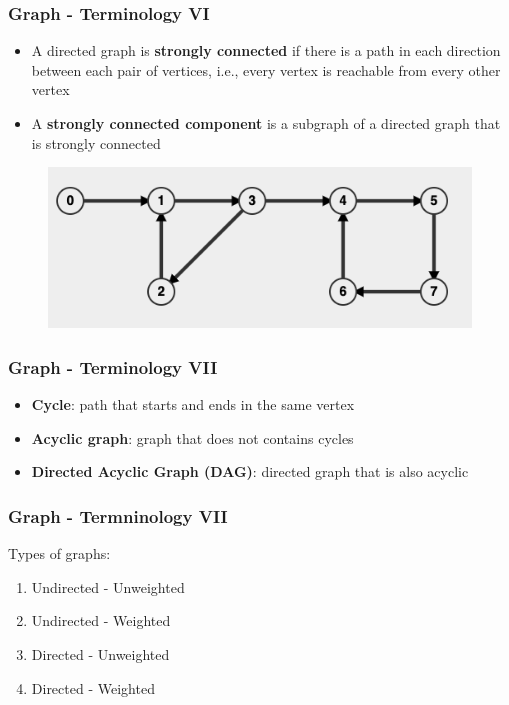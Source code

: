\documentclass{beamer}
\begin{document}
\begin{frame}[fragile]
\frametitle{Graph - Terminology VI}

\begin{itemize}
\item A directed graph is \textbf{strongly connected} if there is a path in each direction between each pair of vertices, i.e., every vertex is reachable from every other vertex
\item A \textbf{strongly connected component} is a subgraph of a directed graph that is strongly connected
\end{itemize}

\begin{figure}
	\centering
	\includegraphics[scale=0.3]{imgs/2.4/graph/directed-graph.png}
\end{figure}
\end{frame}

\begin{frame}
\frametitle{Graph - Terminology VII}
	\begin{itemize}
	    \item \textbf{Cycle}: path that starts and ends in the same vertex
	    \item \textbf{Acyclic graph}: graph that does not contains cycles
	    \item \textbf{Directed Acyclic Graph (DAG)}: directed graph that is also acyclic
	\end{itemize}
\end{frame}

\begin{frame}
\frametitle{Graph - Termninology VII}
	Types of graphs:
	\begin{enumerate}
	    \item Undirected - Unweighted
	    \item Undirected - Weighted
	    \item Directed - Unweighted
	    \item Directed - Weighted
	\end{enumerate}
\end{frame}
\end{document}
